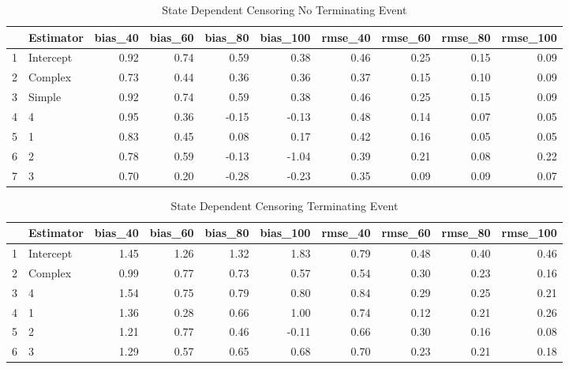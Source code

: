 \begin{table}[ht]
\centering
\begin{tabular}{rlrrrrrrrr}
  \hline
 & Estimator & bias\_40 & bias\_60 & bias\_80 & bias\_100 & rmse\_40 & rmse\_60 & rmse\_80 & rmse\_100 \\ 
  \hline
1 & Intercept & 0.92 & 0.74 & 0.59 & 0.38 & 0.46 & 0.25 & 0.15 & 0.09 \\ 
  2 & Complex & 0.73 & 0.44 & 0.36 & 0.36 & 0.37 & 0.15 & 0.10 & 0.09 \\ 
  3 & Simple & 0.92 & 0.74 & 0.59 & 0.38 & 0.46 & 0.25 & 0.15 & 0.09 \\ 
  4 & 4 & 0.95 & 0.36 & -0.15 & -0.13 & 0.48 & 0.14 & 0.07 & 0.05 \\ 
  5 & 1 & 0.83 & 0.45 & 0.08 & 0.17 & 0.42 & 0.16 & 0.05 & 0.05 \\ 
  6 & 2 & 0.78 & 0.59 & -0.13 & -1.04 & 0.39 & 0.21 & 0.08 & 0.22 \\ 
  7 & 3 & 0.70 & 0.20 & -0.28 & -0.23 & 0.35 & 0.09 & 0.09 & 0.07 \\ 
   \hline
\end{tabular}
\caption{State Dependent Censoring 
 No Terminating Event} 
\end{table}
\begin{table}[ht]
\centering
\begin{tabular}{rlrrrrrrrr}
  \hline
 & Estimator & bias\_40 & bias\_60 & bias\_80 & bias\_100 & rmse\_40 & rmse\_60 & rmse\_80 & rmse\_100 \\ 
  \hline
1 & Intercept & 1.45 & 1.26 & 1.32 & 1.83 & 0.79 & 0.48 & 0.40 & 0.46 \\ 
  2 & Complex & 0.99 & 0.77 & 0.73 & 0.57 & 0.54 & 0.30 & 0.23 & 0.16 \\ 
  3 & 4 & 1.54 & 0.75 & 0.79 & 0.80 & 0.84 & 0.29 & 0.25 & 0.21 \\ 
  4 & 1 & 1.36 & 0.28 & 0.66 & 1.00 & 0.74 & 0.12 & 0.21 & 0.26 \\ 
  5 & 2 & 1.21 & 0.77 & 0.46 & -0.11 & 0.66 & 0.30 & 0.16 & 0.08 \\ 
  6 & 3 & 1.29 & 0.57 & 0.65 & 0.68 & 0.70 & 0.23 & 0.21 & 0.18 \\ 
   \hline
\end{tabular}
\caption{State Dependent Censoring 
 Terminating Event} 
\end{table}
